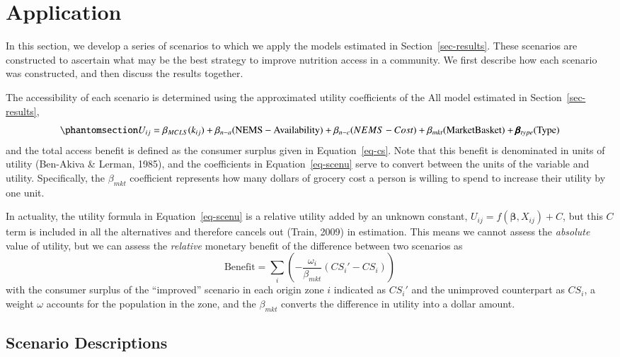 \documentclass[
  letterpaper,
  number,
  review,
  doubleblind,
  3p]{elsarticle}
\begin{document}

\section{Application}\label{sec-scenarios}

In this section, we develop a series of scenarios to which we apply the
models estimated in Section~\ref{sec-results}. These scenarios are
constructed to ascertain what may be the best strategy to improve
nutrition access in a community. We first describe how each scenario was
constructed, and then discuss the results together.

The accessibility of each scenario is determined using the approximated
utility coefficients of the All model estimated in
Section~\ref{sec-results},
\begin{equation}\phantomsection\label{eq-scenu}{
U_{ij}= \beta_{MCLS}( k_{ij}) +  \beta_{n-a} (\mathrm{NEMS-Availability}) +
  \beta_{n-c}\mathrm({NEMS-Cost}) + \\ \beta_{mkt} (\mathrm{Market Basket}) + \pmb{\beta}_{type}(\mathrm{Type})  
}\end{equation} and the total access benefit is defined as the consumer
surplus given in Equation~\ref{eq-cs}. Note that this benefit is
denominated in units of utility (Ben-Akiva \& Lerman, 1985), and the
coefficients in Equation~\ref{eq-scenu} serve to convert between the
units of the variable and utility. Specifically, the \(\beta_{mkt}\)
coefficient represents how many dollars of grocery cost a person is
willing to spend to increase their utility by one unit.

In actuality, the utility formula in Equation~\ref{eq-scenu} is a
relative utility added by an unknown constant,
\(U_{ij} = f(\mathbf{\beta}, X_{ij}) + C\), but this \(C\) term is
included in all the alternatives and therefore cancels out (Train, 2009)
in estimation. This means we cannot assess the \emph{absolute} value of
utility, but we can assess the \emph{relative} monetary benefit of the
difference between two scenarios as \[
\mathrm{Benefit} = \sum_{i}\left(-\frac{\omega_i}{\beta_{mkt}}(CS_i' - CS_i)\right)
\] with the consumer surplus of the ``improved'' scenario in each origin
zone \(i\) indicated as \(CS_i'\) and the unimproved counterpart as
\(CS_i\), a weight \(\omega\) accounts for the population in the zone,
and the \(\beta_{mkt}\) converts the difference in utility into a dollar
amount.

\subsection{Scenario Descriptions}\label{scenario-descriptions}
\end{document}
